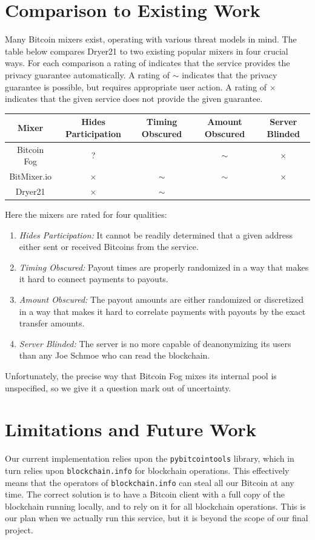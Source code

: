\documentclass[12pt]{article}
\newcommand{\sw}[1]{\footnotesize{}#1}
\newcommand{\cmark}{\checkmark}
\newcommand{\xmark}{$\times$}
\begin{document}
\section{Comparison to Existing Work}
Many Bitcoin mixers exist, operating with various threat models in mind.
The table below compares Dryer21 to two existing popular mixers in four crucial ways.
For each comparison a rating of \cmark{} indicates that the service provides the privacy guarantee automatically.
A rating of $\sim$ indicates that the privacy guarantee is possible, but requires appropriate user action.
A rating of \xmark{} indicates that the given service does not provide the given guarantee.
\begin{center}
\begin{tabular}{c|c|c|c|c}
Mixer       & \sw{Hides Participation} & \sw{Timing Obscured} & \sw{Amount Obscured} & \sw{Server Blinded} \\\hline
Bitcoin Fog & ? & \cmark & $\sim$ & \xmark \\\hline
BitMixer.io & \xmark & $\sim$ & $\sim$ & \xmark \\\hline
Dryer21     & \xmark & $\sim$ & \cmark & \cmark
\end{tabular}
\end{center}
Here the mixers are rated for four qualities:
\begin{enumerate}
\item \emph{Hides Participation:} It cannot be readily determined that a given address either sent or received Bitcoins from the service.
\item \emph{Timing Obscured:} Payout times are properly randomized in a way that makes it hard to connect payments to payouts.
\item \emph{Amount Obscured:} The payout amounts are either randomized or discretized in a way that makes it hard to correlate payments with payouts by the exact transfer amounts.
\item \emph{Server Blinded:} The server is no more capable of deanonymizing its users than any Joe Schmoe who can read the blockchain.
\end{enumerate}
Unfortunately, the precise way that Bitcoin Fog mixes its internal pool is unspecified, so we give it a question mark out of uncertainty.

\section{Limitations and Future Work}
Our current implementation relies upon the \texttt{pybitcointools} library, which in turn relies upon \texttt{blockchain.info} for blockchain operations.
This effectively means that the operators of \texttt{blockchain.info} can steal all our Bitcoin at any time.
The correct solution is to have a Bitcoin client with a full copy of the blockchain running locally, and to rely on it for all blockchain operations.
This is our plan when we actually run this service, but it is beyond the scope of our final project.
\end{document}
